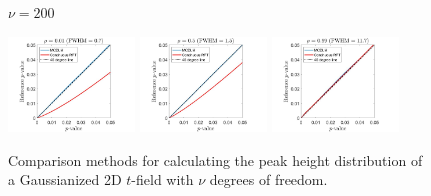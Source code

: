 \documentclass{article}
\begin{document}
\begin{figure}[!htp]
\begin{sideways}
\phantom{------------------}$\nu = 200$
\end{sideways}
\includegraphics[trim=70 5 100 5, clip,width=0.3\textwidth]{figure/2D_nu200_rho0.01_gauss.jpg}
\includegraphics[trim=70 5 100 5, clip,width=0.3\textwidth]{figure/2D_nu200_rho0.5_gauss.jpg}
\includegraphics[trim=70 5 100 5, clip,width=0.3\textwidth]{figure/2D_nu200_rho0.99_gauss.jpg}
\caption{Comparison methods for calculating the peak height distribution of a Gaussianized 2D $t$-field with $\nu$ degrees of freedom. \label{fig.t2gauss2D}}
\end{figure}
\end{document}
